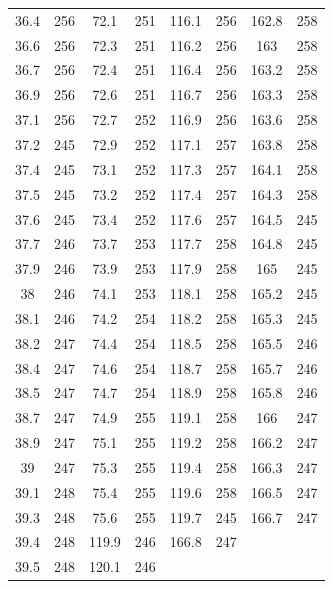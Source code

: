 \documentclass[12pt]{ctexart}
\numberwithin{equation}{section}
\begin{document}
\begin{longtable}{cc|cc|cc|cc}
36.4  &  256  &  72.1  &  251  &  116.1  &  256  &  162.8  &  258  \\
36.6  &  256  &  72.3  &  251  &  116.2  &  256  &  163  &  258  \\
36.7  &  256  &  72.4  &  251  &  116.4  &  256  &  163.2  &  258  \\
36.9  &  256  &  72.6  &  251  &  116.7  &  256  &  163.3  &  258  \\
37.1  &  256  &  72.7  &  252  &  116.9  &  256  &  163.6  &  258  \\
37.2  &  245  &  72.9  &  252  &  117.1  &  257  &  163.8  &  258  \\
37.4  &  245  &  73.1  &  252  &  117.3  &  257  &  164.1  &  258  \\
37.5  &  245  &  73.2  &  252  &  117.4  &  257  &  164.3  &  258  \\
37.6  &  245  &  73.4  &  252  &  117.6  &  257  &  164.5  &  245  \\
37.7  &  246  &  73.7  &  253  &  117.7  &  258  &  164.8  &  245  \\
37.9  &  246  &  73.9  &  253  &  117.9  &  258  &  165  &  245  \\
38  &  246  &  74.1  &  253  &  118.1  &  258  &  165.2  &  245  \\
38.1  &  246  &  74.2  &  254  &  118.2  &  258  &  165.3  &  245  \\
38.2  &  247  &  74.4  &  254  &  118.5  &  258  &  165.5  &  246  \\
38.4  &  247  &  74.6  &  254  &  118.7  &  258  &  165.7  &  246  \\
38.5  &  247  &  74.7  &  254  &  118.9  &  258  &  165.8  &  246  \\
38.7  &  247  &  74.9  &  255  &  119.1  &  258  &  166  &  247  \\
38.9  &  247  &  75.1  &  255  &  119.2  &  258  &  166.2  &  247  \\
39  &  247  &  75.3  &  255  &  119.4  &  258  &  166.3  &  247  \\
39.1  &  248  &  75.4  &  255  &  119.6  &  258  &  166.5  &  247  \\
39.3  &  248  &  75.6  &  255  &  119.7  &  245  &  166.7  &  247  \\
39.4  &  248  &  119.9  &  246  &  166.8  &  247  \\
39.5  &  248  &  120.1  &  246  \\

\end{longtable}
\end{document}
